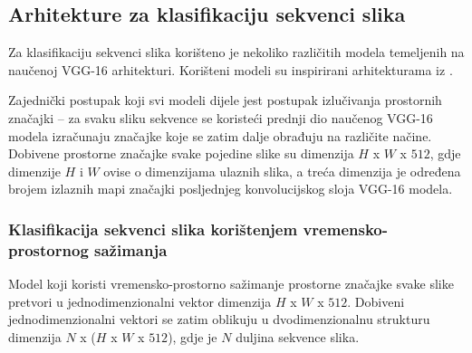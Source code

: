 \documentclass[times, utf8, diplomski, numeric]{fer}
\begin{document}
\subsection{Arhitekture za klasifikaciju sekvenci slika}
Za klasifikaciju sekvenci slika korišteno je nekoliko različitih modela temeljenih na naučenoj VGG-16 arhitekturi. 
Korišteni modeli su inspirirani arhitekturama iz \citep{article:sequential_architectures}.

Zajednički postupak koji svi modeli dijele jest postupak izlučivanja prostornih značajki -- za svaku sliku sekvence se koristeći prednji dio naučenog VGG-16 modela izračunaju značajke koje se zatim dalje obrađuju na različite načine.
Dobivene prostorne značajke svake pojedine slike su dimenzija $H$ x $W$ x $512$, gdje dimenzije $H$ i $W$ ovise o dimenzijama ulaznih slika, a treća dimenzija je određena brojem izlaznih mapi značajki posljednjeg konvolucijskog sloja VGG-16 modela. 

\subsubsection{Klasifikacija sekvenci slika korištenjem vremensko-prostornog sažimanja}
Model koji koristi vremensko-prostorno sažimanje prostorne značajke svake slike pretvori u jednodimenzionalni vektor dimenzija $H$ x $W$ x $512$.
Dobiveni jednodimenzionalni vektori se zatim oblikuju u dvodimenzionalnu strukturu dimenzija $N$ x ($H$ x $W$ x $512$), gdje je $N$ duljina sekvence slika.
\end{document}
